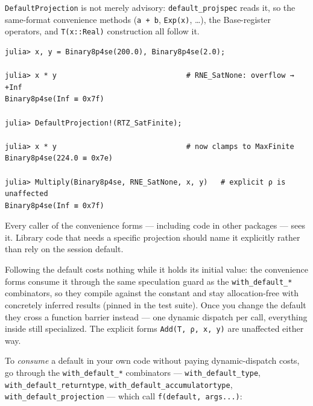 \texttt{DefaultProjection} is not merely advisory: \texttt{default\_projspec} reads it, so the same-format convenience methods (\texttt{a + b}, \texttt{Exp(x)}, …), the Base-register operators, and \texttt{T(x::Real)} construction all follow it.




\begin{verbatim}
julia> x, y = Binary8p4se(200.0), Binary8p4se(2.0);

julia> x * y                              # RNE_SatNone: overflow → +Inf
Binary8p4se(Inf ≡ 0x7f)

julia> DefaultProjection!(RTZ_SatFinite);

julia> x * y                              # now clamps to MaxFinite
Binary8p4se(224.0 ≡ 0x7e)

julia> Multiply(Binary8p4se, RNE_SatNone, x, y)   # explicit ρ is unaffected
Binary8p4se(Inf ≡ 0x7f)
\end{verbatim}



\begin{tcolorbox}[toptitle=-1mm,bottomtitle=1mm,colback=admonition-warning!50!white,colframe=admonition-warning,title=\textbf{Changing the default is a global semantic change}]
Every caller of the convenience forms — including code in other packages — sees it. Library code that needs a specific projection should name it explicitly rather than rely on the session default.

\end{tcolorbox}


Following the default costs nothing while it holds its initial value: the convenience forms consume it through the same speculation guard as the \texttt{with\_default\_*} combinators, so they compile against the constant and stay allocation-free with concretely inferred results (pinned in the test suite). Once you change the default they cross a function barrier instead — one dynamic dispatch per call, everything inside still specialized. The explicit forms \texttt{Add(T, ρ, x, y)} are unaffected either way.



To \emph{consume} a default in your own code without paying dynamic-dispatch costs, go through the \texttt{with\_default\_*} combinators — \texttt{with\_default\_type}, \texttt{with\_default\_returntype}, \texttt{with\_default\_accumulatortype}, \texttt{with\_default\_projection} — which call \texttt{f(default, args...)}:




